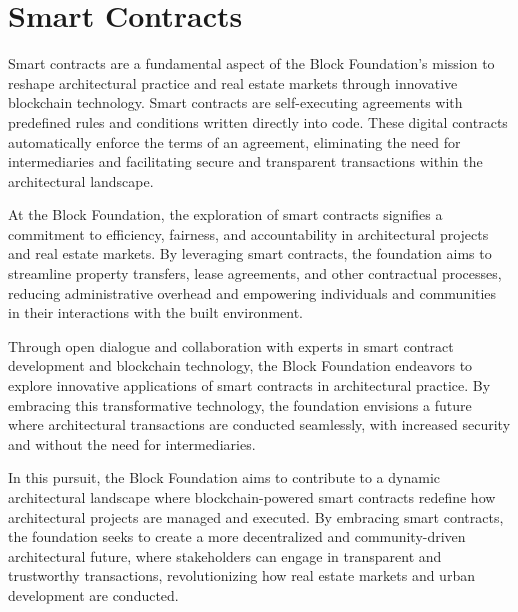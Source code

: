 \section{Smart Contracts}


Smart contracts are a fundamental aspect of the Block Foundation's mission to reshape architectural practice and real estate markets through innovative blockchain technology. Smart contracts are self-executing agreements with predefined rules and conditions written directly into code. These digital contracts automatically enforce the terms of an agreement, eliminating the need for intermediaries and facilitating secure and transparent transactions within the architectural landscape.

At the Block Foundation, the exploration of smart contracts signifies a commitment to efficiency, fairness, and accountability in architectural projects and real estate markets. By leveraging smart contracts, the foundation aims to streamline property transfers, lease agreements, and other contractual processes, reducing administrative overhead and empowering individuals and communities in their interactions with the built environment.

Through open dialogue and collaboration with experts in smart contract development and blockchain technology, the Block Foundation endeavors to explore innovative applications of smart contracts in architectural practice. By embracing this transformative technology, the foundation envisions a future where architectural transactions are conducted seamlessly, with increased security and without the need for intermediaries.

In this pursuit, the Block Foundation aims to contribute to a dynamic architectural landscape where blockchain-powered smart contracts redefine how architectural projects are managed and executed. By embracing smart contracts, the foundation seeks to create a more decentralized and community-driven architectural future, where stakeholders can engage in transparent and trustworthy transactions, revolutionizing how real estate markets and urban development are conducted.